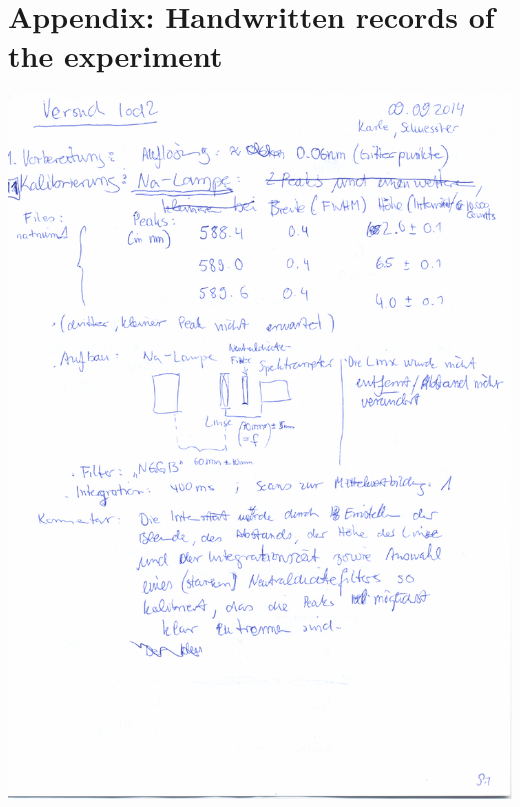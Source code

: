 \section{Appendix: Handwritten records of the experiment}
    \includegraphics[width=\linewidth]{record/iod2_record_01}
\clearpage
